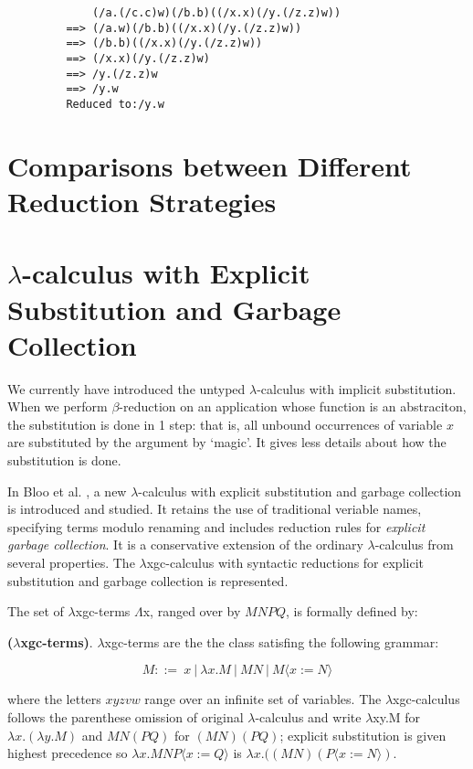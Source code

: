 \begin{verbatim}
             (/a.(/c.c)w)(/b.b)((/x.x)(/y.(/z.z)w))
         ==> (/a.w)(/b.b)((/x.x)(/y.(/z.z)w))
         ==> (/b.b)((/x.x)(/y.(/z.z)w))
         ==> (/x.x)(/y.(/z.z)w)
         ==> /y.(/z.z)w
         ==> /y.w
         Reduced to:/y.w
\end{verbatim}


\section{Comparisons between Different Reduction Strategies }



\section{$\lambda$-calculus with Explicit Substitution and Garbage Collection}

We currently have introduced the untyped $\lambda$-calculus with implicit substitution. When we perform $\beta$-reduction on an application whose function is an abstraciton, the substitution is done in 1 step: that is, all unbound occurrences of variable $x$ are substituted by the argument by `magic'. It gives less details about how the substitution is done. 

In Bloo et al. \cite{bloo1995preservation}, a new $\lambda$-calculus with explicit substitution and garbage collection is introduced and studied. It retains the use of traditional veriable names, specifying terms modulo renaming and includes reduction rules for \textit{explicit garbage collection}. It is a conservative extension of the ordinary $\lambda$-calculus from several properties. The $\lambda$xgc-calculus with syntactic reductions for explicit substitution and garbage collection is represented.    

\noindent The set of $\lambda$xgc-terms $\Lambda$x, ranged over by $MNPQ$, is formally defined by: 
\begin{def1}
\normalfont \textbf{($\lambda$xgc-terms)}. $\lambda$xgc-terms are the the class satisfing the following grammar: 
\end{def1}
\begin{equation*}
M ::= \ x\ |\ \lambda x.M\ |\ MN\ |\ M\langle x:=N\rangle
\end{equation*}

where the letters $xyzvw$ range over an infinite set of variables. The $\lambda$xgc-calculus follows the parenthese omission of original $\lambda$-calculus and write $\lambda$xy.M for $\lambda x.(\lambda y.M)$ and $MN(PQ)$ for $(MN)(PQ)$; explicit substitution is given highest precedence so $\lambda x.MNP\langle x:=Q\rangle $ is $\lambda x.((MN)(P\langle x:=N\rangle )$.

